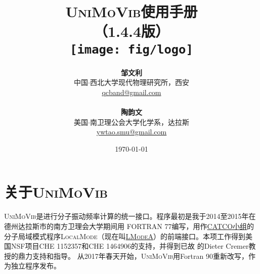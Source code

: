 \documentclass[12pt,a4paper,openany,twoside,cap,UTF8]{ctexbook}
\begin{document}

\title{
\vspace{-3cm}
\hei\textsc{UniMoVib}使用手册  \\
\vspace{1cm} （1.4.4版）\vspace{20 mm} \\
\texttt{[image: fig/logo]} \vspace{10 mm}}

\author{
\textbf{邹文利} \\
中国$\cdot$西北大学现代物理研究所，西安  \\
\href{mailto:qcband@gmail.com}{qcband@gmail.com}
\\ \\
\textbf{陶韵文} \\
美国$\cdot$南卫理公会大学化学系，达拉斯  \\
\href{mailto:ywtao.smu@gmail.com}{ywtao.smu@gmail.com}
}

\date{\vspace{1cm}  \today}
\maketitle

\setcounter{page}{1}   %
\renewcommand\contentsname{目\qquad 录}
\makeatletter
\let\ps@plain\ps@empty
\makeatother
\tableofcontents            %

\mainmatter
\chapter{关于\textsc{UniMoVib}}
\label{part:about}

\textsc{UniMoVib}是进行分子振动频率计算的统一接口。程序最初是我于2014至2015年在德州达拉斯市的南方卫理会大学期间用 FORTRAN 77编写，用作\href{https://sites.smu.edu/dedman/catco/}{CATCO小组}的分子局域模式程序\textsc{LocalMode}（现在叫\href{https://sites.smu.edu/dedman/catco/}{\textsc{LModeA}}）的前端接口。本项工作得到美国NSF项目CHE 1152357和CHE 1464906的支持，并得到已故 的Dieter Cremer教授的鼎力支持和指导。
从2017年春天开始，\textsc{UniMoVib}用Fortran 90重新改写，作为独立程序发布。
\end{document}
